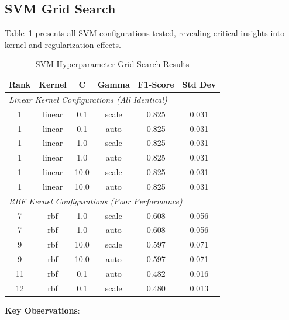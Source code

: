 \subsection{SVM Grid Search}

Table~\ref{tab:svm_grid_search_all} presents all SVM configurations tested, revealing critical insights into kernel and regularization effects.

\begin{table}[h]
\centering
\caption{SVM Hyperparameter Grid Search Results}
\label{tab:svm_grid_search_all}
\begin{tabular}{cccccc}
\toprule
\textbf{Rank} & \textbf{Kernel} & \textbf{C} & \textbf{Gamma} & \textbf{F1-Score} & \textbf{Std Dev} \\
\midrule
\multicolumn{6}{l}{\textit{Linear Kernel Configurations (All Identical)}} \\
1 & linear & 0.1 & scale & 0.825 & 0.031 \\
1 & linear & 0.1 & auto & 0.825 & 0.031 \\
1 & linear & 1.0 & scale & 0.825 & 0.031 \\
1 & linear & 1.0 & auto & 0.825 & 0.031 \\
1 & linear & 10.0 & scale & 0.825 & 0.031 \\
1 & linear & 10.0 & auto & 0.825 & 0.031 \\
\midrule
\multicolumn{6}{l}{\textit{RBF Kernel Configurations (Poor Performance)}} \\
7 & rbf & 1.0 & scale & 0.608 & 0.056 \\
7 & rbf & 1.0 & auto & 0.608 & 0.056 \\
9 & rbf & 10.0 & scale & 0.597 & 0.071 \\
9 & rbf & 10.0 & auto & 0.597 & 0.071 \\
11 & rbf & 0.1 & auto & 0.482 & 0.016 \\
12 & rbf & 0.1 & scale & 0.480 & 0.013 \\
\bottomrule
\end{tabular}
\end{table}

\textbf{Key Observations}:

